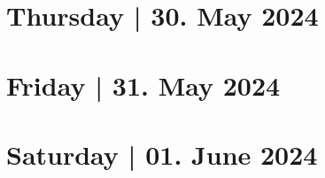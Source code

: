 \documentclass[openany, parskip=full, 12pt, a4]{scrbook}
\begin{document}
\chapter{Thursday | 30. May 2024}




\chapter{Friday | 31. May 2024}



\chapter{Saturday | 01. June 2024}




\newpage
\pagecolor{myblue}
\thispagestyle{empty}
\mbox{}
\end{document}
